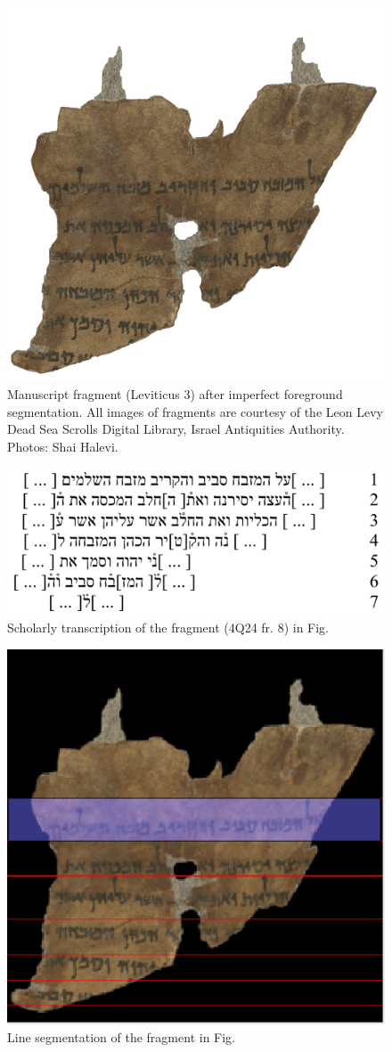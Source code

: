 \begin{figure}[t] \centering
	\includegraphics[width=.5\textwidth]{images/ms.png}
	\caption{Manuscript fragment (Leviticus 3) after imperfect foreground
	segmentation. All images of fragments are courtesy of the Leon Levy
	Dead Sea Scrolls Digital Library, Israel Antiquities Authority. Photos:
	Shai Halevi.\label{fig:ms}}
\end{figure}

\begin{figure}[t] \centering
	\includegraphics[width=.7\textwidth]{images/4Q24_f8.png} 
	\caption{Scholarly transcription of the fragment (4Q24 fr. 8) in Fig.}%
	\label{fig:trans}
\end{figure}

\begin{figure}[t] \centering
	\includegraphics[width=.5\textwidth]{images/lines.png}
	\caption{Line segmentation of the fragment in Fig.}%
	\label{fig:lines}
\end{figure}

